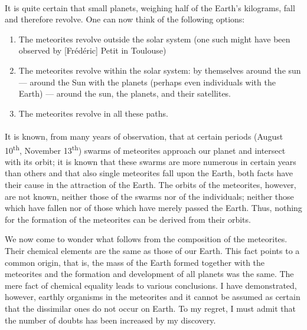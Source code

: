 \documentclass[a4paper, 12pt, oneside]{article}
\begin{document}
\paragraph*{}
It is quite certain that small planets, weighing half of the Earth's kilograms, fall and therefore revolve. One can now think of the following options:
\begin{enumerate}
    \item The meteorites revolve outside the solar system (one such might have been observed by [Frédéric] Petit in Toulouse)
    \item The meteorites revolve within the solar system: by themselves around the sun --- around the Sun with the planets (perhaps even individuals with the Earth) --- around the sun, the planets, and their satellites.
    \item The meteorites revolve in all these paths.
\end{enumerate}
\paragraph*{}
It is known, from many years of observation, that at certain periods (August 10\textsuperscript{th}, November 13\textsuperscript{th}) swarms of meteorites approach our planet and intersect with its orbit; it is known that these swarms are more numerous in certain years than others and that also single meteorites fall upon the Earth, both facts have their cause in the attraction of the Earth. The orbits of the meteorites, however, are not known, neither those of the swarms nor of the individuals; neither those which have fallen nor of those which have merely passed the Earth. Thus, nothing for the formation of the meteorites can be derived from their orbits.

We now come to wonder what follows from the composition of the meteorites. Their chemical elements are the same as those of our Earth. This fact points to a common origin, that is, the mass of the Earth formed together with the meteorites and the formation and development of all planets was the same. The mere fact of chemical equality leads to various conclusions. I have demonstrated, however, earthly organisms in the meteorites and it cannot be assumed as certain that the dissimilar ones do not occur on Earth. To my regret, I must admit that the number of doubts has been increased by my discovery.
\end{document}
